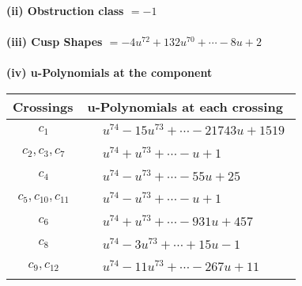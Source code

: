 \documentclass[1p]{elsarticle_modified}
\theoremstyle{definition}
\begin{document}
\flushleft \textbf{(ii) Obstruction class $= -1$}\\~\\
\flushleft \textbf{(iii) Cusp Shapes $= -4 u^{72}+132 u^{70}+\cdots-8 u+2$}\\~\\
\newpage\renewcommand{\arraystretch}{1}
\flushleft \textbf{(iv) u-Polynomials at the component}\newline \\
\begin{tabular}{m{50pt}|m{274pt}}
Crossings & \hspace{64pt}u-Polynomials at each crossing \\
\hline $$\begin{aligned}c_{1}\end{aligned}$$&$\begin{aligned}
&u^{74}-15 u^{73}+\cdots-21743 u+1519
\end{aligned}$\\
\hline $$\begin{aligned}c_{2},c_{3},c_{7}\end{aligned}$$&$\begin{aligned}
&u^{74}+u^{73}+\cdots- u+1
\end{aligned}$\\
\hline $$\begin{aligned}c_{4}\end{aligned}$$&$\begin{aligned}
&u^{74}- u^{73}+\cdots-55 u+25
\end{aligned}$\\
\hline $$\begin{aligned}c_{5},c_{10},c_{11}\end{aligned}$$&$\begin{aligned}
&u^{74}- u^{73}+\cdots- u+1
\end{aligned}$\\
\hline $$\begin{aligned}c_{6}\end{aligned}$$&$\begin{aligned}
&u^{74}+u^{73}+\cdots-931 u+457
\end{aligned}$\\
\hline $$\begin{aligned}c_{8}\end{aligned}$$&$\begin{aligned}
&u^{74}-3 u^{73}+\cdots+15 u-1
\end{aligned}$\\
\hline $$\begin{aligned}c_{9},c_{12}\end{aligned}$$&$\begin{aligned}
&u^{74}-11 u^{73}+\cdots-267 u+11
\end{aligned}$\\
\hline
\end{tabular}\\~\\
\end{document}
